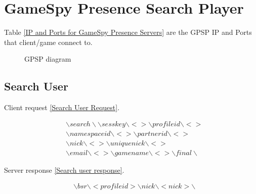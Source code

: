 \documentclass[oneside,titlepage,a4paper]{Definition/retrospy} %
\begin{document}
\section{GameSpy Presence Search Player}
Table \ref{IP and Ports for GameSpy Presence Servers} are the GPSP IP and Ports that client/game connect to.

\begin{figure}[H]
	\centering
	\caption{GPSP diagram}
	\label{GPSP diagram}
\end{figure}

\subsection{Search User}
Client request \ref{Search User Request}.

\begin{tcolorbox}
	\begin{equation}\label{Search User Request}
	\begin{split}
	&\backslash search\backslash\backslash sesskey \backslash < >\backslash profileid \backslash < > \\ &\backslash namespaceid\backslash < >  \backslash partnerid\backslash < >\\
	& \backslash nick \backslash < > \backslash uniquenick \backslash < > \\ 
	&\backslash email \backslash < > \backslash gamename \backslash < > \backslash final \backslash
	\end{split}
	\end{equation}
\end{tcolorbox}

Server response \ref{Search user response}.

\begin{tcolorbox}
	\begin{equation}\label{Search user response}
	\begin{split}
&\backslash bsr \backslash < profileid > \backslash nick \backslash < nick > \backslash 
	\end{split}
	\end{equation}
\end{tcolorbox}
\end{document}
